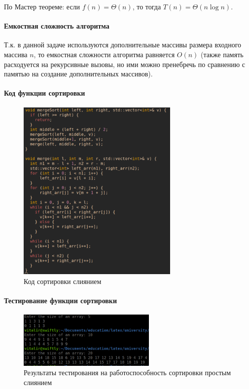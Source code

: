 \documentclass[a4paper, 14pt]{extarticle}
\begin{document}
По Мастер теореме: если $f(n) = \Theta(n)$, то тогда  $T(n) = \Theta(n\log n)$.
\paragraph{Емкостная сложность алгоритма}
Т.к. в данной задаче используются дополнительные массивы размера
входного массива $n$, то емкостная сложности алгоритма равняется $O(n)$
(также память расходуется на рекурсивные вызовы, но ими можно пренебречь
по сравнению с памятью на создание дополнительных массивов).
\newpage
\paragraph{Код функции сортировки}
\begin{figure}[htpb]
  \centering
  \includegraphics[width=0.7\textwidth]{pictures/third_sort_code.png}
  \caption{Код сортировки слиянием}
  \label{fig:first_sort_code}
\end{figure}
\newpage
\paragraph{Тестирование функции сортировки}
\begin{figure}[htpb]
  \centering
  \includegraphics[width=0.6\textwidth]{pictures/third_sort_test.png}
  \caption{Результаты тестирования на работоспособность сортировки простым слиянием}
  \label{fig:first_sort_test}
\end{figure}
\end{document}
